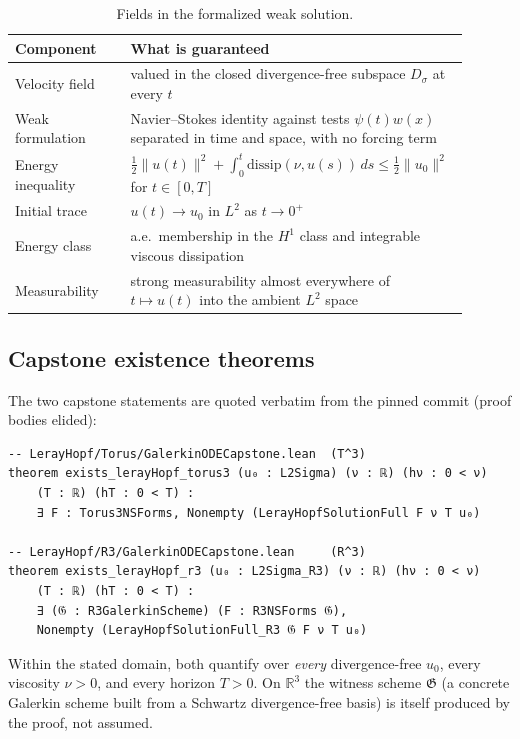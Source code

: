 \begin{table}[h]
\centering
\caption{Fields in the formalized weak solution.}\label{tab:solution-fields}
\begin{tabular}{@{}p{0.25\linewidth}p{0.65\linewidth}@{}}
\toprule
Component & What is guaranteed \\
\midrule
Velocity field & valued in the closed divergence-free subspace $D_\sigma$ at every $t$ \\
Weak formulation & Navier--Stokes identity against tests $\psi(t)w(x)$ separated in time and space, with no forcing term \\
Energy inequality & $\tfrac12\|u(t)\|^2 + \int_0^t \mathrm{dissip}(\nu,u(s))\,ds \le \tfrac12\|u_0\|^2$ for $t\in[0,T]$ \\
Initial trace & $u(t)\to u_0$ in $L^2$ as $t\to 0^+$ \\
Energy class & a.e.\ membership in the $H^1$ class and integrable viscous dissipation \\
Measurability & strong measurability almost everywhere of $t\mapsto u(t)$ into the ambient $L^2$ space \\
\bottomrule
\end{tabular}
\end{table}

\subsection{Capstone existence theorems}

The two capstone statements are quoted verbatim from the pinned commit
(proof bodies elided):

\begin{lstlisting}
-- LerayHopf/Torus/GalerkinODECapstone.lean  (T^3)
theorem exists_lerayHopf_torus3 (u₀ : L2Sigma) (ν : ℝ) (hν : 0 < ν)
    (T : ℝ) (hT : 0 < T) :
    ∃ F : Torus3NSForms, Nonempty (LerayHopfSolutionFull F ν T u₀)

-- LerayHopf/R3/GalerkinODECapstone.lean     (R^3)
theorem exists_lerayHopf_r3 (u₀ : L2Sigma_R3) (ν : ℝ) (hν : 0 < ν)
    (T : ℝ) (hT : 0 < T) :
    ∃ (𝔊 : R3GalerkinScheme) (F : R3NSForms 𝔊),
    Nonempty (LerayHopfSolutionFull_R3 𝔊 F ν T u₀)
\end{lstlisting}

Within the stated domain, both quantify over \emph{every} divergence-free
$u_0$, every viscosity $\nu>0$, and every horizon $T>0$. On
$\mathbb{R}^3$ the
witness scheme $\mathfrak{G}$ (a concrete Galerkin scheme built from a
Schwartz divergence-free basis) is itself produced by the proof, not
assumed.

